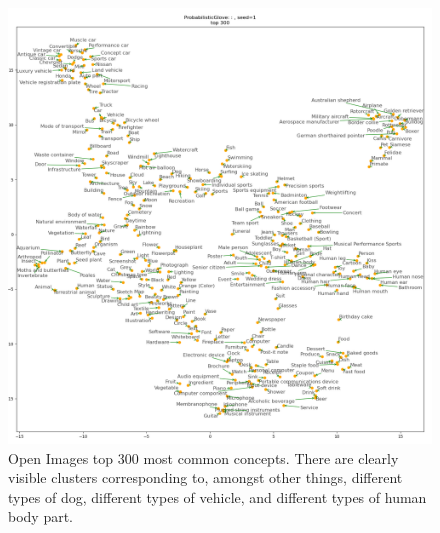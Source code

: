 \begin{figure}[H]
\label{fig:gloveclusters}
    \centering
    \includegraphics[width=\textwidth]{images/method/probabilistic_independent/top300_tsne_openimages__ProbabilisticGlove_1.png}
    \caption{
        Open Images top 300 most common concepts. There are clearly visible clusters corresponding to, amongst other things, different types of dog, different types of vehicle, and different types of human body part.
    }
\end{figure}

